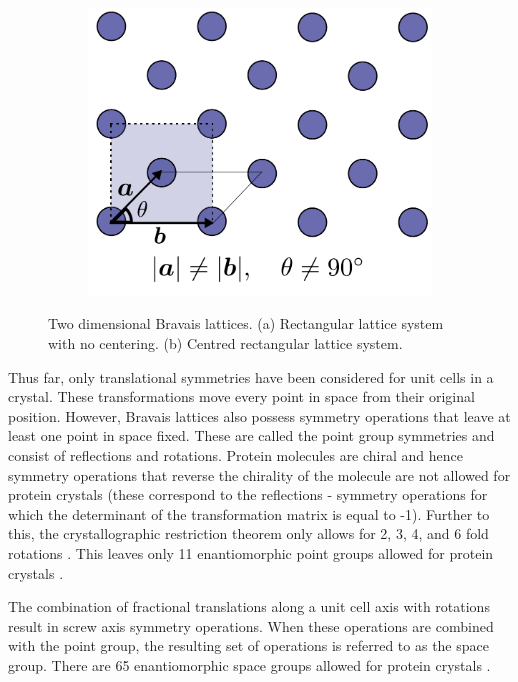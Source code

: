 \begin{figure}
\begin{subfigure}[b]{0.45\textwidth}
                    \includegraphics[width=\textwidth]{figures/introduction/centredrectangularbravaislattice.pdf}
                    \caption{}
                    \label{fig:2D centred rectangular Bravais lattice}
            \end{subfigure}
            \caption[Two dimensional Bravais lattices.]{Two dimensional Bravais lattices. (a) Rectangular lattice system with no centering. (b) Centred rectangular lattice system.}
    		\label{fig:2D Bravais lattices}
        \end{figure}

        Thus far, only translational symmetries have been considered for unit cells in a crystal.
        These transformations move every point in space from their original position.
        However, Bravais lattices also possess symmetry operations that leave at least one point in space fixed.
        These are called the point group symmetries and consist of reflections and rotations.
        Protein molecules are chiral and hence symmetry operations that reverse the chirality of the molecule are not allowed for protein crystals (these correspond to the reflections - symmetry operations for which the determinant of the transformation matrix is equal to -1).
        Further to this, the crystallographic restriction theorem only allows for 2, 3, 4, and 6 fold rotations \cite{coxeter1973regular}.
        This leaves only 11 enantiomorphic point groups allowed for protein crystals \cite{drenth2012}.

        The combination of fractional translations along a unit cell axis with rotations result in screw axis symmetry operations.
        When these operations are combined with the point group, the resulting set of operations is referred to as the space group.
        There are 65 enantiomorphic space groups allowed for protein crystals \cite{drenth2012}.

